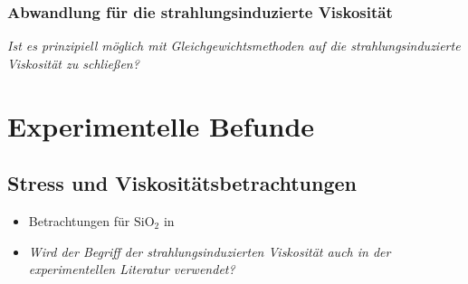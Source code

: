 \documentclass[a4paper, 10pt, 
               numbers=noenddot, toc=graduated,
               headsepline=true, footsepline=true,
               twoside=false, titlepage=true, 
               bibliography=totoc]{scrartcl}
\begin{document}
	\subsubsection{Abwandlung für die strahlungsinduzierte Viskosität}
	\textit{Ist es prinzipiell möglich mit Gleichgewichtsmethoden auf die strahlungsinduzierte Viskosität zu schließen?}

\section{Experimentelle Befunde}

\subsection{Stress und Viskositätsbetrachtungen}
	\begin{itemize}
		\item Betrachtungen für $\mathrm{SiO_2}$ in \cite{Snoeks2000}
		\item \textit{Wird der Begriff der strahlungsinduzierten Viskosität auch in der experimentellen Literatur verwendet?}
	\end{itemize}





\end{document}
